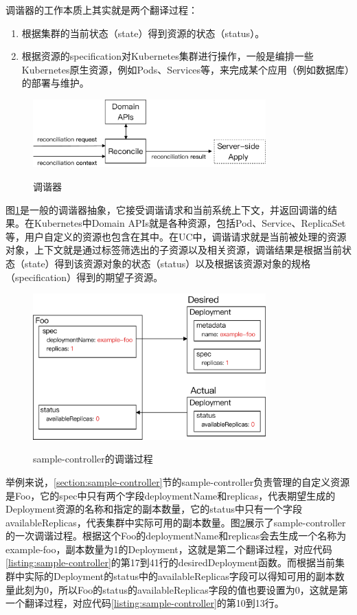 \documentclass[macfonts,master]{njuthesis}
\begin{document}
调谐器的工作本质上其实就是两个翻译过程：
\begin{enumerate}
	\item 根据集群的当前状态（state）得到资源的状态（status）。
	\item 根据资源的specification对Kubernetes集群进行操作，一般是编排一些Kubernetes原生资源，例如Pods、Services等，来完成某个应用（例如数据库）的部署与维护。
\end{enumerate}

\begin{figure}[htbp]
  \centering
  \includegraphics[width= 0.8\textwidth]{pics/reconciler-interface.pdf}\\
  \caption{调谐器}\label{fig:reconciler}
\end{figure}

图\ref{fig:reconciler}是一般的调谐器抽象，它接受调谐请求和当前系统上下文，并返回调谐的结果。在Kubernetes中Domain APIs就是各种资源，包括Pod、Service、ReplicaSet等，用户自定义的资源也包含在其中。在UC中，调谐请求就是当前被处理的资源对象，上下文就是通过标签筛选出的子资源以及相关资源，调谐结果是根据当前状态（state）得到该资源对象的状态（status）以及根据该资源对象的规格（specification）得到的期望子资源。

\begin{figure}[htbp]
  \centering
  \includegraphics[width=0.8\textwidth]{pics/Foo-reconciliation.pdf}\\
  \caption{sample-controller的调谐过程}\label{fig:Foo-reconciliation}
\end{figure}

举例来说，\ref{section:sample-controller}节的sample-controller负责管理的自定义资源是Foo，它的spec中只有两个字段deploymentName和replicas，代表期望生成的Deployment资源的名称和指定的副本数量，它的status中只有一个字段availableReplicas，代表集群中实际可用的副本数量。图\ref{fig:Foo-reconciliation}展示了sample-controller的一次调谐过程。根据这个Foo的deploymentName和replicas会去生成一个名称为example-foo，副本数量为1的Deployment，这就是第二个翻译过程，对应代码\ref{listing:sample-controller}的第17到41行的desiredDeployment函数。而根据当前集群中实际的Deployment的status中的availableReplicas字段可以得知可用的副本数量此刻为0，所以Foo的status的availableReplicas字段的值也要设置为0，这就是第一个翻译过程，对应代码\ref{listing:sample-controller}的第10到13行。
\end{document}
